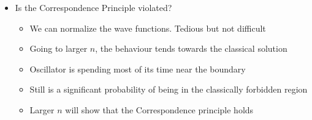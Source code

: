 \documentclass[12pt]{article}
\begin{document}
\begin{itemize}
\begin{itemize}
    \end{itemize}
    \item Is the Correspondence Principle violated? \begin{itemize}
        \item We can normalize the wave functions. Tedious but not difficult 
        \item Going to larger $n$, the behaviour tends towards the classical solution 
        \item Oscillator is spending most of its time near the boundary 
        \item Still is a significant probability of being in the classically forbidden region 
        \item Larger $n$ will show that the Correspondence principle holds 
    \end{itemize}
\end{itemize}
\end{document}
